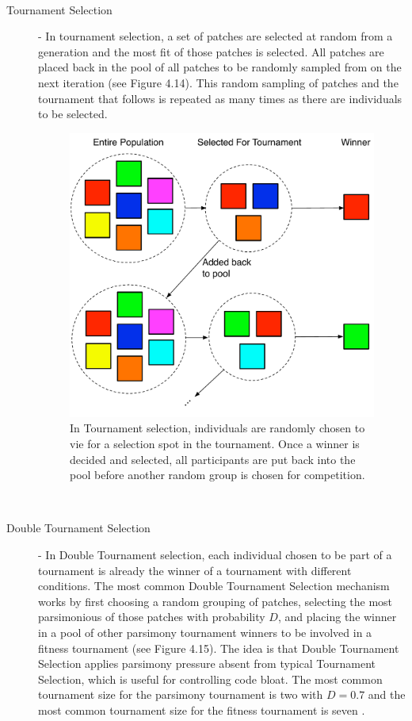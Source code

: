 \documentclass[12pt]{report} 	%
\numberwithin{figure}{chapter}
\numberwithin{table}{chapter}
\numberwithin{equation}{chapter}
\begin{document}
\begin{flushleft}
\begin{description}
\begin{figure}[h!]
\begin{center}
\end{center}
\end{figure}
\\
\item [Tournament Selection] - In tournament selection, a set of patches are selected at random from a generation and the most fit of those patches is selected. All patches are placed back in the pool of all patches to be randomly sampled from on the next iteration (see Figure 4.14). This random sampling of patches and the tournament that follows is repeated as many times as there are individuals to be selected.
\begin{figure}[h!]
\begin{center}
\includegraphics[scale = 0.6]{TournamentSelection}
\caption[Tournament selection]{In Tournament selection, individuals are randomly chosen to vie for a selection spot in the tournament. Once a winner is decided and selected, all participants are put back into the pool before another random group is chosen for competition.}
\end{center}
\end{figure}
\\
\item [Double Tournament Selection] - In Double Tournament selection, each individual chosen to be part of a tournament is already the winner of a tournament with different conditions. The most common Double Tournament Selection mechanism works by first choosing a random grouping of patches, selecting the most parsimonious of those patches with probability $D$, and placing the winner in a pool of other parsimony tournament winners to be involved in a fitness tournament (see Figure 4.15). The idea is that Double Tournament Selection applies parsimony pressure absent from typical Tournament Selection, which is useful for controlling code bloat. The most common tournament size for the parsimony tournament is two with $D = 0.7$ and the most common tournament size for the fitness tournament is seven \cite[p. 21]{luke2006comparison}.

\end{description}
\end{flushleft}
\end{document}
